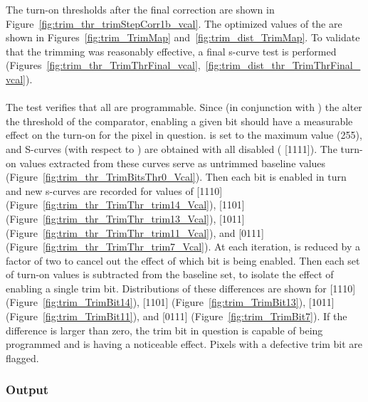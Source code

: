 The turn-on thresholds after the final correction are shown in Figure~\ref{fig:trim_thr_trimStepCorr1b_vcal}.
The optimized values of the \trimbits are shown in Figures~\ref{fig:trim_TrimMap} and~\ref{fig:trim_dist_TrimMap}.
To validate that the trimming was reasonably effective, 
a final s-curve test is performed (Figures~\ref{fig:trim_thr_TrimThrFinal_vcal},~\ref{fig:trim_dist_thr_TrimThrFinal_vcal}).
\\\\
The \trimbit test verifies that all \trimbits are programmable.
Since (in conjunction with \vtrim) the \trimbits alter the threshold of the comparator,
enabling a given bit should have a measurable effect on the \vcal turn-on for the pixel in question.
\vtrim is set to the maximum value (255),
and S-curves (with respect to \vcal) are obtained with all \trimbits disabled ( [1111]).
The turn-on values extracted from these curves serve as untrimmed baseline values (Figure~\ref{fig:trim_thr_TrimBitsThr0_Vcal}).
Then each bit is enabled in turn and new s-curves are recorded for values of 
 [1110] (Figure~\ref{fig:trim_thr_TrimThr_trim14_Vcal}),
 [1101] (Figure~\ref{fig:trim_thr_TrimThr_trim13_Vcal}),
 [1011] (Figure~\ref{fig:trim_thr_TrimThr_trim11_Vcal}), 
and  [0111] (Figure~\ref{fig:trim_thr_TrimThr_trim7_Vcal}).
At each iteration, \vtrim is reduced by a factor of two to cancel out the effect of which bit is being enabled.
Then each set of turn-on values is subtracted from the baseline set, to isolate the effect of enabling a single trim bit.
Distributions of these differences are shown for 
 [1110] (Figure~\ref{fig:trim_TrimBit14}),
 [1101] (Figure~\ref{fig:trim_TrimBit13}),
 [1011] (Figure~\ref{fig:trim_TrimBit11}),
and  [0111] (Figure~\ref{fig:trim_TrimBit7}).
If the difference is larger than zero, the trim bit in question is capable of being programmed and is having a noticeable effect.
Pixels with a defective trim bit are flagged.

\subsubsection{Output}

